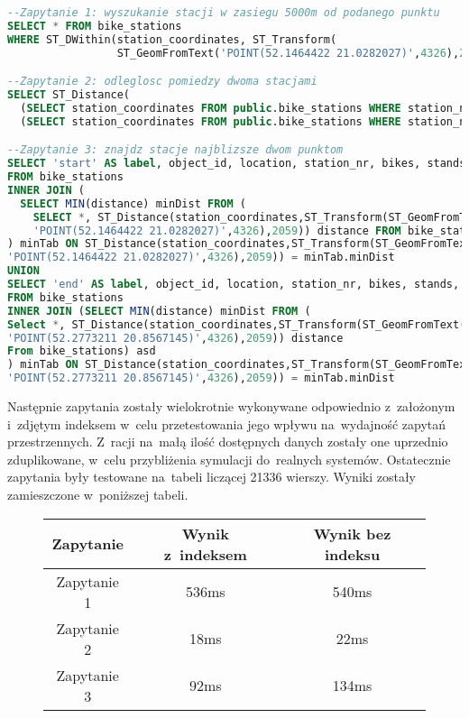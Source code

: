 \documentclass[11pt,a4paper]{article}
\begin{document}
\begin{lstlisting}[language=SQL,caption=Zapytania służące do testowania indeksu.]
--Zapytanie 1: wyszukanie stacji w zasiegu 5000m od podanego punktu
SELECT * FROM bike_stations
WHERE ST_DWithin(station_coordinates, ST_Transform(
                 ST_GeomFromText('POINT(52.1464422 21.0282027)',4326),2059), 5000);

--Zapytanie 2: odleglosc pomiedzy dwoma stacjami
SELECT ST_Distance(
  (SELECT station_coordinates FROM public.bike_stations WHERE station_nr = 6300),
  (SELECT station_coordinates FROM public.bike_stations WHERE station_nr = 6301))

--Zapytanie 3: znajdz stacje najblizsze dwom punktom
SELECT 'start' AS label, object_id, location, station_nr, bikes, stands, minDist
FROM bike_stations
INNER JOIN (
  SELECT MIN(distance) minDist FROM (
    SELECT *, ST_Distance(station_coordinates,ST_Transform(ST_GeomFromText(
    'POINT(52.1464422 21.0282027)',4326),2059)) distance FROM bike_stations) asd
) minTab ON ST_Distance(station_coordinates,ST_Transform(ST_GeomFromText(
'POINT(52.1464422 21.0282027)',4326),2059)) = minTab.minDist
UNION
SELECT 'end' AS label, object_id, location, station_nr, bikes, stands, minDist
FROM bike_stations
INNER JOIN (SELECT MIN(distance) minDist FROM (
Select *, ST_Distance(station_coordinates,ST_Transform(ST_GeomFromText(
'POINT(52.2773211 20.8567145)',4326),2059)) distance
From bike_stations) asd
) minTab ON ST_Distance(station_coordinates,ST_Transform(ST_GeomFromText(
'POINT(52.2773211 20.8567145)',4326),2059)) = minTab.minDist
\end{lstlisting}

Następnie zapytania zostały wielokrotnie wykonywane odpowiednio z~założonym i~zdjętym indeksem w~celu przetestowania jego wpływu na~wydajność zapytań przestrzennych. Z~racji na~małą ilość dostępnych danych zostały one uprzednio zduplikowane, w~celu przybliżenia symulacji do~realnych systemów. Ostatecznie zapytania były testowane na~tabeli liczącej 21336 wierszy. Wyniki zostały zamieszczone w~poniższej tabeli.

\begin{figure}[H]
\begin{tabular}{ | c | c | c | }
\hline \textbf{Zapytanie} & \textbf{Wynik z~indeksem} & \textbf{Wynik bez indeksu} \\ \hline
  Zapytanie 1 & 536ms & 540ms \\ \hline
  Zapytanie 2 & 18ms & 22ms \\ \hline
  Zapytanie 3 & 92ms & 134ms \\ \hline
\end{tabular}
\end{figure}
\end{document}
